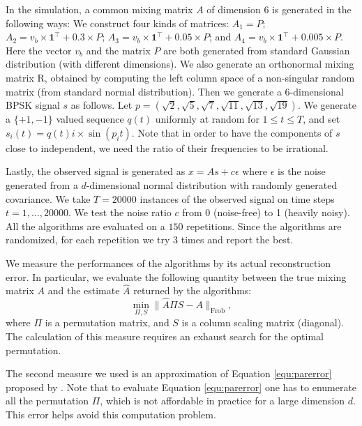 \documentclass[twoside,11pt]{article}
\begin{document}
In the simulation, a common mixing matrix $A$ of dimension 6 is generated in the following ways:
We construct four kinds of matrices:
$A_1 = P$; 
$A_2 = v_b\times\boldsymbol{1}^{\top} + 0.3\times P$;
$A_3 = v_b\times\boldsymbol{1}^{\top} + 0.05\times P$;
and $A_4 = v_b\times\boldsymbol{1}^{\top} + 0.005\times P$.
Here the vector $v_b$ and the matrix $P$ are both generated from standard Gaussian distribution (with different dimensions).
We also generate an orthonormal mixing matrix R, obtained by computing the left column space of a non-singular random matrix (from standard normal distribution).  
Then we generate a $6$-dimensional BPSK signal $s$ as follows. Let $p=(\sqrt{2},\sqrt{5},\sqrt{7},\sqrt{11},\sqrt{13},\sqrt{19})$.
We generate a $\{+1,-1\}$ valued sequence $q(t)$ uniformly at random for $1 \le t \le T$, and set
$s_i(t) = q(t) i\times\sin (p_i t)$.
Note that in order to have the components of $s$ close to independent, we need the ratio of their frequencies to be irrational. 

Lastly, the observed signal is generated as $x = As+c\epsilon$ where $\epsilon$ is the noise generated from a $d$-dimensional normal distribution with randomly generated covariance. 
We take $T=20000$ instances of the observed signal on time steps $t= 1,\ldots, 20000$.
We test the noise ratio $c$ from 0 (noise-free) to 1 (heavily noisy). 
All the algorithms are evaluated on a $150$ repetitions. 
Since the algorithms are randomized, for each repetition we try $3$ times and report the best.

We measure the performances of the algorithms by its actual reconstruction error.
In particular, we evaluate the following quantity between the true mixing matrix $A$ and the estimate $\hat{A}$ returned by the algorithms:
\begin{equation}
\label{equ:parerror}
\min_{\Pi,S} \|\hat{A}\Pi S - A\|_{\text{Frob}},
\end{equation}
where $\Pi$ is a permutation matrix, and $S$ is a column scaling matrix (diagonal).
The calculation of this measure requires an exhaust search for the optimal permutation.

The second measure we used is an approximation of Equation \eqref{equ:parerror} proposed by \citet{comon1994independent}. 
Note that to evaluate Equation \eqref{equ:parerror} one has to enumerate all the permutation $\Pi$, which is not affordable in practice for a large dimension $d$. 
This error helps avoid this computation problem. 
\end{document}
